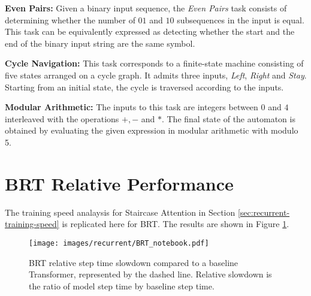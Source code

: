 \textbf{Even Pairs:} Given a binary input sequence, the \emph{Even Pairs} task consists of determining whether the number of $01$ and $10$ subsequences in the input is equal. This task can be equivalently expressed as detecting whether the start and the end of the binary input string are the same symbol.

\textbf{Cycle Navigation:} This task corresponds to a finite-state machine consisting of five states arranged on a cycle graph. It admits three inputs, \emph{Left}, \emph{Right} and \emph{Stay}. Starting from an initial state, the cycle is traversed according to the inputs.

\textbf{Modular Arithmetic:} The inputs to this task are integers between $0$ and $4$ interleaved with the operations $+, -$ and $*$. The final state of the automaton is obtained by evaluating the given expression in modular arithmetic with modulo 5.

\section{BRT Relative Performance} \label{sec:recurrent-brt-performance}
The training speed analaysis for Staircase Attention in Section \ref{sec:recurrent-training-speed} is replicated here for BRT. The results are shown in Figure \ref{fig:brt-speed}.

\begin{figure}
    \centering
    \texttt{[image: images/recurrent/BRT\_notebook.pdf]}
    \caption{BRT relative step time slowdown compared to a baseline Transformer, represented by the dashed line. Relative slowdown is the ratio of model step time by baseline step time.}
    \label{fig:brt-speed}
\end{figure}